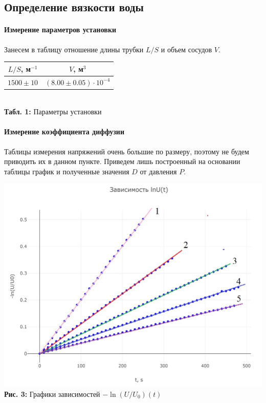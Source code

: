 \documentclass[12pt,a4paper]{scrartcl}
\begin{document}
	\subsection{Определение вязкости воды}
	
	\paragraph{Измерение параметров установки} \hfill
	
	Занесем в таблицу отношение длины трубки $L/S$ и объем сосудов $V$.
	\begin{center}
		\begin{tabular}{|c|c|}
			\hline
			$L/S$, м$^{-1}$ & $V$, м$^3$ \\\hline
			$1500 \pm 10$ & $(8.00 \pm 0.05) \cdot 10^{-4}$ \\\hline
		\end{tabular}
		\\\textbf{Табл. 1:} Параметры установки 
	\end{center} 

	\paragraph{Измерение коэффициента диффузии} \hfill
	
	Таблицы измерения напряжений очень большие по размеру, поэтому не будем приводить их в данном пункте. Приведем лишь построенный на основании таблицы график и полученные значения $D$ от давления $P$.
	
	\begin{center}
		\includegraphics[scale=0.4]{PIC_3.jpg}
		\\\textbf{Рис. 3:} Графики зависимостей $-\ln(U/U_0)(t)$
	\end{center}
	
\end{document}
